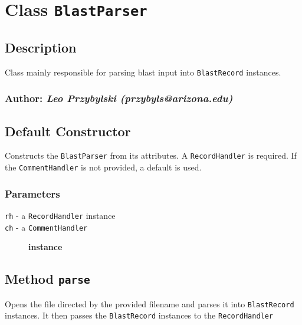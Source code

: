 

\section{Class \texttt{BlastParser}\label{Class_BlastParser}}
\subsection*{Description\label{Description}}


Class mainly responsible for parsing blast input into \texttt{BlastRecord} instances.

\subsubsection*{Author: \textit{Leo Przybylski (przybyls@arizona.edu)}\label{Author:_Leo_Przybylski_przybyls_arizona_edu_}}
\subsection*{Default Constructor\label{Default_Constructor}}


Constructs the \texttt{BlastParser} from its attributes. A \texttt{RecordHandler} is
required. If the \texttt{CommentHandler} is not provided, a default is used.

\subsubsection*{Parameters\label{Parameters}}
\begin{description}

\item[{\texttt{rh} - a \texttt{RecordHandler} instance}] \mbox{}
\item[{\texttt{ch} - a \texttt{CommentHandler}}] \textbf{instance}\end{description}
\subsection*{Method \texttt{parse}\label{Method_parse}}


Opens the file directed by the provided filename and parses it into \texttt{BlastRecord} instances.
It then passes the \texttt{BlastRecord} instances to the \texttt{RecordHandler}

